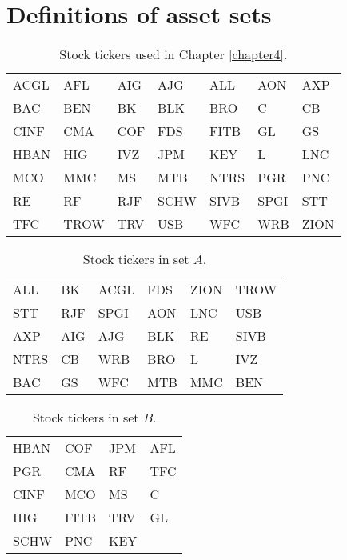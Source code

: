 \documentclass[12pt,a4paper]{report}
\begin{document}
\chapter{Definitions of asset sets}
\begin{center}
\begin{table}[H]
\centering
\begin{tabular}{lllllll}
\toprule
 ACGL &   AFL &  AIG &   AJG &   ALL &   AON &   AXP \\
  BAC &   BEN &   BK &   BLK &   BRO &     C &    CB \\
 CINF &   CMA &  COF &   FDS &  FITB &    GL &    GS \\
 HBAN &   HIG &  IVZ &   JPM &   KEY &     L &   LNC \\
   MCO &   MMC &   MS &   MTB &  NTRS &   PGR &   PNC \\
   RE &    RF &  RJF &  SCHW &  SIVB &  SPGI &   STT \\
   TFC &  TROW &  TRV &   USB &   WFC &   WRB &  ZION \\
   \bottomrule
\end{tabular}
\caption{Stock tickers used in Chapter \ref{chapter4}.}
\label{table:stock_tickers_used}
\end{table}

\begin{table}[H]
\centering
\begin{tabular}{llllll}
\toprule
ALL &   BK &  ACGL &  FDS &  ZION &  TROW \\
 STT &  RJF &  SPGI &  AON &   LNC &   USB \\
 AXP &  AIG &   AJG &  BLK &    RE &  SIVB \\
 NTRS &   CB &   WRB &  BRO &     L &   IVZ \\
  BAC &   GS &   WFC &  MTB &   MMC &   BEN \\
  \bottomrule
\end{tabular}
\caption{Stock tickers in set $A$.}
\label{table:stock_tickers_in_set_A}
\end{table}


\begin{table}[H]
\centering
\begin{tabular}{llll}
\toprule
 HBAN &   COF &  JPM &  AFL \\
 PGR &   CMA &   RF &  TFC \\
 CINF &   MCO &   MS &    C \\
  HIG &  FITB &  TRV &   GL \\
 SCHW &   PNC &  KEY &     \\
 \bottomrule
\end{tabular}
\caption{Stock tickers in set $B$.}
\label{table:stock_tickers_in_set_B}
\end{table}


\end{center}
\end{document}
